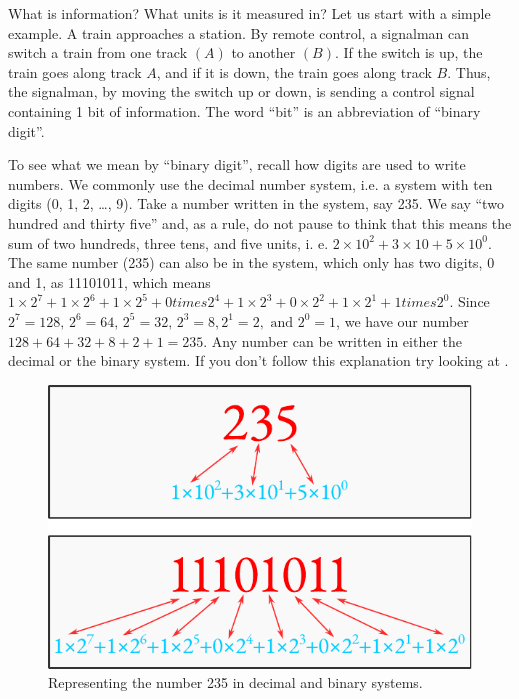  What is information? What units is it
measured in? Let us start with a simple example. A train approaches
a station. By remote control, a signalman can switch a train from one
track $(A)$ to another $(B)$. If the switch is up, the train goes along track $A$, and if it is down, the train goes along track $B$. Thus, the signalman, by
moving the switch up or down, is sending a control signal containing
1 bit of information. The word ``bit'' is an abbreviation of ``binary digit''.

To see what we mean by ``binary digit'', recall how digits are used to
write numbers. We commonly use the decimal number system, i.e.
a system with ten digits (0, 1, 2, \ldots , 9). Take a number written in the
 system, say 235. We say ``two hundred and thirty five'' and, as
a rule, do not pause to think that this means the sum of two hundreds,
three tens, and five units, i. e. $2 \times 10^{2} + 3 \times 10 + 5 \times 10^{0}$. The same number (235) can also be in the  system, which only has two digits, 0 and 1, as 11101011, which means $1 \times 2^{7} + 1 \times 2^{6} + 1 \times 2^{5} + 0 times 2^{4} + 1 \times 2^{3} + 0 \times 2^{2} + 1 \times 2^{1} + 1 times 2^{0}$. Since $2^{7} = 128, \, 2^{6} = 64, \, 2^{5} = 32, \, 2^{3} = 8, 2^{1} = 2, \,\, \text{and} \,\, 2^{0} = 1$, we have our number $128 + 64 + 32 + 8 + 2 + 1 = 235$. Any number can be written in either the
decimal or the binary system. If you don't follow this explanation try
looking at .

\begin{figure}[!ht]
 \centering
 \includegraphics[width=0.75\tfwidth]{figures/binary-conversion.pdf}
\caption{Representing the number 235 in decimal and binary systems.
\label{binary-conversion}}
 \end{figure}

